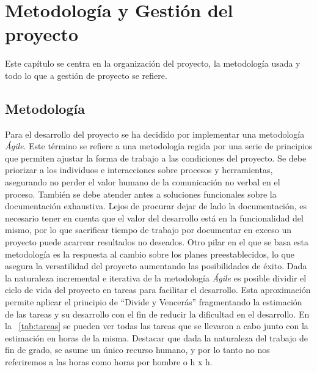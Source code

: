 \chapter{Metodología y Gestión del proyecto}
\label{chap:mygp}
Este capítulo se centra en la organización del proyecto, la metodología usada y todo lo que a gestión de proyecto se refiere.
\section{Metodología}
Para el desarrollo del proyecto se ha decidido por implementar una metodología \textit{Ágile}. Este término se refiere a una metodología regida por una serie de principios que permiten ajustar la forma de trabajo a las condiciones del proyecto. Se debe priorizar a los individuos e interacciones sobre procesos y herramientas, asegurando no perder el valor humano de la comunicación no verbal en el proceso. También se debe atender antes a soluciones funcionales sobre la documentación exhaustiva. Lejos de procurar dejar de lado la documentación, es necesario tener en cuenta que el valor del desarrollo está en la funcionalidad del mismo, por lo que sacrificar tiempo de trabajo por documentar en exceso un proyecto puede acarrear resultados no deseados.
Otro pilar en el que se basa esta metodología es la respuesta al cambio sobre los planes preestablecidos, lo que asegura la versatilidad del proyecto aumentando las posibilidades de éxito.
Dada la naturaleza incremental e iterativa de la metodología \textit{Ágile} es posible dividir el ciclo de vida del proyecto en tareas para facilitar el desarrollo. Esta aproximación permite aplicar el principio de ``Divide y Vencerás'' fragmentando la estimación de las tareas y su desarrollo con el fin de reducir la dificultad en el desarrollo. En la \tablename~\ref{tab:tareas} se pueden ver todas las tareas que se llevaron a cabo junto con la estimación en horas de la misma. Destacar que dada la naturaleza del trabajo de fin de grado, se asume un único recurso humano, y por lo tanto no nos referiremos a las horas como horas por hombre o h x h.

